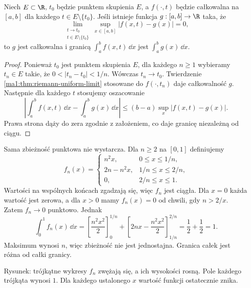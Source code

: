 \begin{wniosek}
\label{ma1:cor:parameter-uniform-limit}
Niech $E\subset\R$, $t_0$ będzie punktem skupienia $E$, a $f(\cdot,t)$ będzie całkowalna na $[a,b]$ dla każdego $t\in E\setminus\{t_0\}$. Jeśli istnieje funkcja $g:[a,b]\to\R$ taka, że
\[
 \lim_{\substack{t\to t_0\\t\in E\setminus\{t_0\}}}
 \sup_{x\in[a,b]}|f(x,t)-g(x)|=0,
\]
to $g$ jest całkowalna i granicą $\int_a^b f(x,t)\,\dd x$ jest $\int_a^b g(x)\,\dd x$.
\end{wniosek}
\begin{proof}
Ponieważ $t_0$ jest punktem skupienia $E$, dla każdego $n\ge1$ wybieramy $t_n\in E$ takie, że $0<|t_n-t_0|<1/n$. Wówczas $t_n\to t_0$. Twierdzenie \ref{ma1:thm:riemann-uniform-limit} stosowane do $f(\cdot,t_n)$ daje całkowalność $g$. Następnie dla każdego $t$ stosujemy oszacowanie
\[
 \left|\int_a^b f(x,t)\,\dd x-\int_a^b g(x)\,\dd x\right|
 \le(b-a)\sup_x|f(x,t)-g(x)|.
\]
Prawa strona dąży do zera zgodnie z założeniem, co daje granicę niezależną od ciągu.
\end{proof}

\begin{przyklad}
\label{ma1:ex:parameter-moving-spike}
Sama zbieżność punktowa nie wystarcza. Dla $n\ge2$ na $[0,1]$ definiujemy
\[
 f_n(x)=
 \begin{cases}
 n^2x,&0\le x\le1/n,\\
 2n-n^2x,&1/n\le x\le2/n,\\
 0,&2/n\le x\le1.
 \end{cases}
\]
Wartości na wspólnych końcach zgadzają się, więc $f_n$ jest ciągła. Dla $x=0$ każda wartość jest zerowa, a dla $x>0$ mamy $f_n(x)=0$ od chwili, gdy $n>2/x$. Zatem $f_n\to0$ punktowo. Jednak
\[
 \int_0^1 f_n(x)\,\dd x
 =\left[\frac{n^2x^2}{2}\right]_0^{1/n}
 +\left[2nx-\frac{n^2x^2}{2}\right]_{1/n}^{2/n}
 =\frac12+\frac12=1.
\]
Maksimum wynosi $n$, więc zbieżność nie jest jednostajna. Granica całek jest różna od całki granicy.
\end{przyklad}
\begin{center}

\small Rysunek: trójkątne wykresy $f_n$ zwężają się, a ich wysokości rosną. Pole każdego trójkąta wynosi $1$. Dla każdego ustalonego $x$ wartość funkcji ostatecznie znika.
\end{center}

